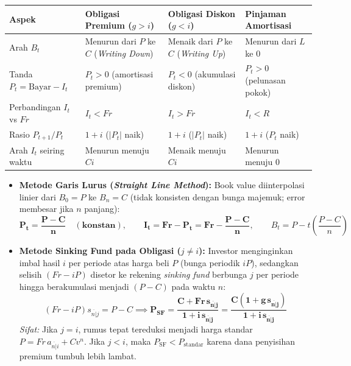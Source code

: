 \documentclass[10pt,a4paper]{article}
\newcommand{\angl}[1]{\overline{#1|}}
\begin{document}
\begin{teoremabox}
\begin{center}
\small
\renewcommand{\arraystretch}{1.2}
\begin{tabular}{@{}p{3.4cm}p{4.3cm}p{4.3cm}p{4.3cm}@{}}
\toprule
\textbf{Aspek} & \textbf{Obligasi Premium ($g > i$)} & \textbf{Obligasi Diskon ($g < i$)} & \textbf{Pinjaman Amortisasi} \\
\midrule
Arah $B_t$ & Menurun dari $P$ ke $C$ (\textit{Writing Down}) & Menaik dari $P$ ke $C$ (\textit{Writing Up}) & Menurun dari $L$ ke $0$ \\
Tanda $P_t = \text{Bayar} - I_t$ & $P_t > 0$ (amortisasi premium) & $P_t < 0$ (akumulasi diskon) & $P_t > 0$ (pelunasan pokok) \\
Perbandingan $I_t$ vs $Fr$ & $I_t < Fr$ & $I_t > Fr$ & $I_t < R$ \\
Rasio $P_{t+1}/P_t$ & $1 + i$ ($|P_t|$ naik) & $1 + i$ ($|P_t|$ naik) & $1 + i$ ($P_t$ naik) \\
Arah $I_t$ seiring waktu & Menurun menuju $Ci$ & Menaik menuju $Ci$ & Menurun menuju $0$ \\
\bottomrule
\end{tabular}
\end{center}
\end{teoremabox}

\begin{rumusbox}
\begin{itemize}[leftmargin=1.5em, topsep=1pt, itemsep=2pt]
    \item \textbf{Metode Garis Lurus (\textit{Straight Line Method}):}
    Book value diinterpolasi linier dari $B_0 = P$ ke $B_n = C$ (tidak konsisten dengan bunga majemuk; error membesar jika $n$ panjang):
    \[
        \mathbf{P_t = \frac{P - C}{n} \quad (\text{konstan})}, \qquad \mathbf{I_t = Fr - P_t = Fr - \frac{P - C}{n}}, \qquad B_t = P - t\left(\frac{P - C}{n}\right)
    \]
    \item \textbf{Metode Sinking Fund pada Obligasi ($j \neq i$):}
    Investor menginginkan imbal hasil $i$ per periode atas harga beli $P$ (bunga periodik $iP$), sedangkan selisih $(Fr - iP)$ disetor ke rekening \textit{sinking fund} berbunga $j$ per periode hingga berakumulasi menjadi $(P - C)$ pada waktu $n$:
    \[
        (Fr - iP) s_{\angl{n}j} = P - C \implies \mathbf{P_{\text{SF}} = \frac{C + Fr \, s_{\angl{n}j}}{1 + i \, s_{\angl{n}j}} = \frac{C\left(1 + g \, s_{\angl{n}j}\right)}{1 + i \, s_{\angl{n}j}}}
    \]
    \textit{Sifat:} Jika $j = i$, rumus tepat tereduksi menjadi harga standar $P = Fr\,a_{\angl{n}i} + Cv^n$. Jika $j < i$, maka $P_{\text{SF}} < P_{\text{standar}}$ karena dana penyisihan premium tumbuh lebih lambat.
\end{itemize}
\end{rumusbox}
\end{document}
